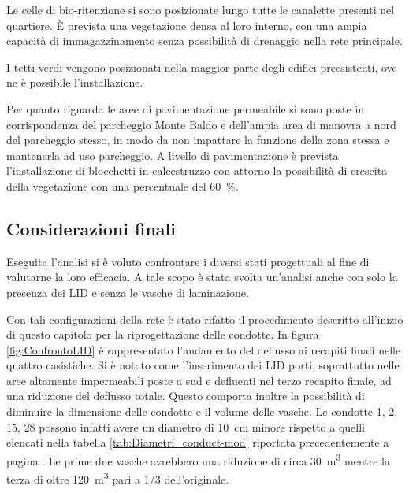 Le celle di bio-ritenzione si sono posizionate lungo tutte le canalette presenti nel quartiere. 
È prevista una vegetazione densa al loro interno, con una ampia capacità di immagazzinamento senza possibilità di drenaggio nella rete principale.

I tetti verdi vengono posizionati nella maggior parte degli edifici preesistenti, ove ne è possibile l'installazione. 

Per quanto riguarda le aree di pavimentazione permeabile si sono poste in corrispondenza del parcheggio Monte Baldo e dell'ampia area di manovra a nord del parcheggio stesso, in modo da non impattare la funzione della zona stessa e mantenerla ad uso parcheggio.
A livello di pavimentazione è prevista l'installazione di blocchetti in calcestruzzo con attorno la possibilità di crescita della vegetazione con una percentuale del \SI{60}{\percent}.

\subsection{Considerazioni finali}
Eseguita l'analisi si è voluto confrontare i diversi stati progettuali al fine di valutarne la loro  efficacia. 
A tale scopo è stata svolta un'analisi anche con solo la presenza dei LID e senza le vasche di laminazione.

Con tali configurazioni della rete è stato rifatto il procedimento descritto all'inizio di questo capitolo per la riprogettazione delle condotte. 
In figura \ref{fig:ConfrontoLID} è rappresentato l'andamento del deflusso ai recapiti finali nelle quattro casistiche.
Si è notato come l'inserimento dei LID porti, soprattutto nelle aree altamente impermeabili poste a sud e defluenti nel terzo recapito finale, ad una riduzione del deflusso totale. 
Questo comporta inoltre la possibilità di diminuire la dimensione delle condotte e il volume delle vasche. Le condotte 1, 2, 15, 28 possono infatti avere un diametro di \SI{10}{\centi\metre} minore rispetto a quelli elencati nella tabella \ref{tab:Diametri_conduct-mod} riportata precedentemente a pagina \pageref{tab:Diametri_conduct-mod}. 
Le prime due vasche avrebbero una riduzione di circa \SI{30}{\metre\cubed} mentre la terza di oltre \SI{120}{\metre\cubed} pari a $1/3$ dell'originale.

